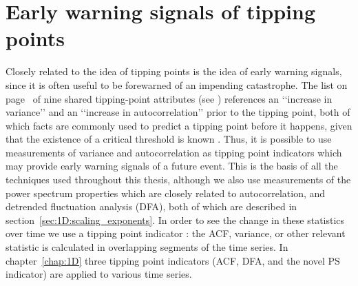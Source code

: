 \section{Early warning signals of tipping points}
\label{sec:intro:EWS}

Closely related to the idea of tipping points is the idea of early warning signals, since it is often useful to be forewarned of an impending catastrophe. The list on page~\pageref{list:intro:nine} of nine shared tipping-point attributes (see \cite{kuehn2011mathematical}) references an ‘‘increase in variance’’ and an ‘‘increase in autocorrelation’’ prior to the tipping point, both of which facts are commonly used to predict a tipping point before it happens, given that the existence of a critical threshold is known \citep{held2004,livina2007,scheffer2009, thompson2011predicting}. Thus, it is possible to use measurements of variance and autocorrelation as tipping point indicators which may provide early warning signals of a future event. This is the basis of all the techniques used throughout this thesis, although we also use measurements of the power spectrum properties which are closely related to autocorrelation, and detrended fluctuation analysis (DFA), both of which are described in section~\ref{sec:1D:scaling_exponents}. In order to see the change in these statistics over time we use a tipping point indicator \citep{held2004}: the ACF, variance, or other relevant statistic is calculated in overlapping segments of the time series. In chapter~\ref{chap:1D} three tipping point indicators (ACF, DFA, and the novel PS indicator) are applied to various time series. 

